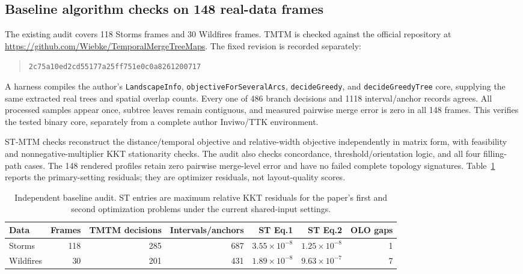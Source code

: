 \subsection{Baseline algorithm checks on 148 real-data frames}
The existing audit covers 118 Storms frames and 30 Wildfires frames. TMTM is checked against the official repository at \url{https://github.com/Wiebke/TemporalMergeTreeMaps}. The fixed revision is recorded separately:
\begin{quote}\small\texttt{2c75a10ed2cd55177a25ff751e0c0a8261200717}\end{quote}
A harness compiles the author's \texttt{LandscapeInfo}, \texttt{objectiveForSeveralArcs}, \texttt{decideGreedy}, and \texttt{decideGreedyTree} core, supplying the same extracted real trees and spatial overlap counts. Every one of 486 branch decisions and 1118 interval/anchor records agrees. All processed samples appear once, subtree leaves remain contiguous, and measured pairwise merge error is zero in all 148 frames. This verifies the tested binary core, separately from a complete author Inviwo/TTK environment.

ST-MTM checks reconstruct the distance/temporal objective and relative-width objective independently in matrix form, with feasibility and nonnegative-multiplier KKT stationarity checks. The audit also checks concordance, threshold/orientation logic, and all four filling-path cases. The 148 rendered profiles retain zero pairwise merge-level error and have no failed complete topology signatures. Table~\ref{tab:s_baseline_audit} reports the primary-setting residuals; they are optimizer residuals, not layout-quality scores.

\begin{table}[H]\centering\small
\caption{Independent baseline audit. ST entries are maximum relative KKT residuals for the paper's first and second optimization problems under the current shared-input settings.}\label{tab:s_baseline_audit}
\begin{tabular}{lrrrrrr}\toprule
Data & Frames & TMTM decisions & Intervals/anchors & ST Eq.1 & ST Eq.2 & OLO gaps\\\midrule
Storms & 118 & 285 & 687 & $3.55\times10^{-8}$ & $1.25\times10^{-8}$ & 1\\
Wildfires & 30 & 201 & 431 & $1.89\times10^{-8}$ & $9.63\times10^{-7}$ & 7\\
\bottomrule\end{tabular}\end{table}

